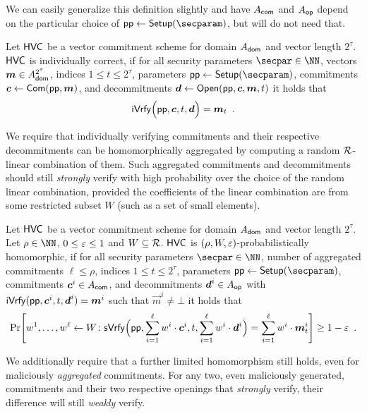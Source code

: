 We can easily generalize this definition slightly and have $A_{\mathsf{com}}$ and $A_{\mathsf{op}}$ depend on the particular choice of $\params\gets\setup(\secparam)$, but will do not need that.
\begin{definition}\label{def:individual_correctness}
Let $\mathsf{HVC}$ be a vector commitment scheme for domain $A_{\mathsf{dom}}$ and vector length $2^\tau$.
  $\mathsf{HVC}$ is individually correct, if for all security parameters $\secpar\in\NN$, vectors $\boldsymbol{m}\in A_{\mathsf{dom}}^{2^\tau}$, indices $1\leq t \leq 2^\tau$, parameters $\params \gets \setup(\secparam)$, commitments $\boldsymbol{c} \gets \mathsf{Com}(\mathsf{pp},\boldsymbol{m})$, and decommitments $\boldsymbol{d} \gets \mathsf{Open}(\mathsf{pp},\boldsymbol{c},\boldsymbol{m},t)$ it holds that
  \[
    \mathsf{iVrfy}\Bigl(\mathsf{pp},\boldsymbol{c},t,\boldsymbol{d}\Bigr) = \boldsymbol{m}_{t}\enspace.
  \]
\end{definition}
%
We require that individually verifying commitments and their respective decommitments can be homomorphically aggregated by computing a random $\mathcal{R}$-linear combination of them.
Such aggregated commitments and decommitments should still \emph{strongly} verify with high probability over the choice of the random linear combination, provided the coefficients of the linear combination are from some restricted subset $W$ (such as a set of small elements).

\begin{definition}\label{def:probabilist_homomorphism}
Let $\mathsf{HVC}$ be a vector commitment scheme for domain $A_{\mathsf{dom}}$ and vector length $2^\tau$.
Let $\rho\in\NN$, $0\leq \varepsilon \leq 1$ and $W\subseteq\mathcal{R}$.
$\mathsf{HVC}$ is $(\rho,W,\varepsilon)$-probabilistically homomorphic, if for all security parameters $\secpar\in\NN$, number of aggregated commitments $\ell \leq \rho$, indices
$1\leq t \leq 2^\tau$,
parameters $\params \gets \setup(\secparam)$, commitments $\boldsymbol{c}^i\in A_{\mathsf{com}}$, and decommitments $\boldsymbol{d}^i\in A_{\mathsf{op}}$ with $\mathsf{iVrfy}(\mathsf{pp},\boldsymbol{c}^i,t,\boldsymbol{d}^i) = \boldsymbol{m}^i$ such that $\vec{m}^i \neq \bot$ it holds that
  \[
    \Pr\mleft[
      w^1,\dots,w^{\ell} \gets W \colon
      \sverify\Bigl(\params,\sum_{i=1}^{\ell}w^i\cdot \vec{c}^i,t,\sum_{i=1}^{\ell}w^i\cdot \vec{d}^i\Bigr) = \sum_{i=1}^{\ell}w^i\cdot\vec{m}^i_{t}
    \mright] \geq 1-\errorbound\enspace.
  \]
\end{definition}
%
We additionally require that a further limited homomorphism still holds, even for maliciously \emph{aggregated} commitments.
For any two, even maliciously generated, commitments and their two respective openings that \emph{strongly} verify, their difference will still \emph{weakly} verify.

